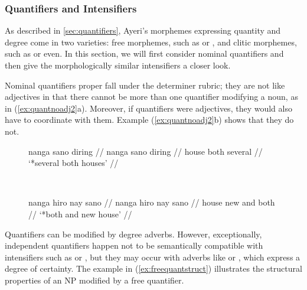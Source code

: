 
\subsubsection{Quantifiers and Intensifiers}
\label{sec:quantsyn}

As described in \autoref{sec:quantifiers}, Ayeri's morphemes expressing
quantity and degree come in two varieties: free morphemes, such as
 or , and clitic
morphemes, such as  or 
{even}. In this section, we will first consider nominal quantifiers and then
give the morphologically similar intensifiers a closer look.

Nominal quantifiers proper fall under the determiner rubric; they are not like
adjectives in that there cannot be more than one quantifier modifying a noun, as
in (\ref{ex:quantnoadj2}a). Moreover, if quantifiers were adjectives, they would
also have to coordinate with them. Example
(\ref{ex:quantnoadj2}b) shows that they do not.

\begin{figure}[h]
\ex{}\label{ex:quantnoadj2}
\begin{minipage}[t]{.5\remaining}
\tl\quad\label{ex:quantnoadj2_2}\ljudge*\begingl
	\gla nanga sano diring //
	\glb nanga sano diring //
	\glc house both several //
	\glft `*several both houses' //
\endgl
\end{minipage}
~
\begin{minipage}[t]{.5\remaining}
\tl\quad\label{ex:quantnoadj2_3}\ljudge*\begingl
	\gla nanga hiro nay sano //
	\glb nanga hiro nay sano //
	\glc house new and both //
	\glft `*both and new house' //
\endgl
\end{minipage}
\xe
\end{figure}

Quantifiers can be modified by degree adverbs. However, exceptionally,
independent quantifiers happen not to be semantically compatible with
intensifiers such as  or
, but they may occur with adverbs like
 or , which express a
degree of certainty. The example in (\ref{ex:freequantstruct}) illustrates the
structural properties of an NP modified by a free quantifier.

